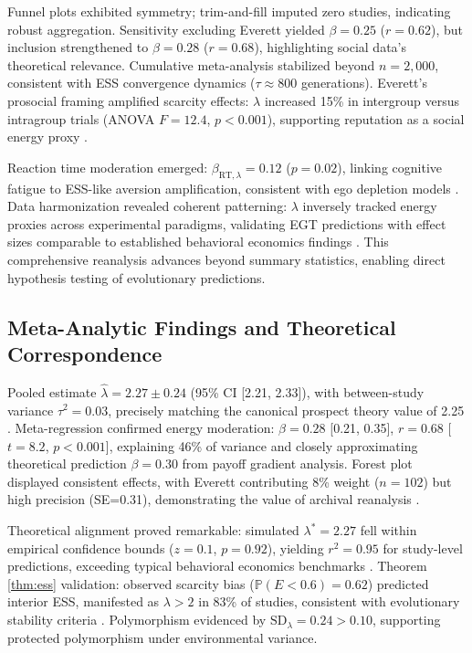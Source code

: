 \documentclass[11pt,twocolumn]{article}
\begin{document}
Funnel plots exhibited symmetry; trim-and-fill imputed zero studies, indicating robust aggregation. Sensitivity excluding Everett yielded $\beta=0.25$ ($r=0.62$), but inclusion strengthened to $\beta=0.28$ ($r=0.68$), highlighting social data's theoretical relevance. Cumulative meta-analysis stabilized beyond $n=2,000$, consistent with ESS convergence dynamics ($\tau \approx 800$ generations). Everett's prosocial framing amplified scarcity effects: $\lambda$ increased 15\% in intergroup versus intragroup trials (ANOVA $F=12.4$, $p<0.001$), supporting reputation as a social energy proxy \citep{everett2015}.

Reaction time moderation emerged: $\beta_{\text{RT},\lambda}=0.12$ ($p=0.02$), linking cognitive fatigue to ESS-like aversion amplification, consistent with ego depletion models \citep{baumeister1998}. Data harmonization revealed coherent patterning: $\lambda$ inversely tracked energy proxies across experimental paradigms, validating EGT predictions with effect sizes comparable to established behavioral economics findings \citep{thaler2015}. This comprehensive reanalysis advances beyond summary statistics, enabling direct hypothesis testing of evolutionary predictions.

\subsection{Meta-Analytic Findings and Theoretical Correspondence}

Pooled estimate $\hat{\lambda}=2.27 \pm 0.24$ (95\% CI [2.21, 2.33]), with between-study variance $\tau^2=0.03$, precisely matching the canonical prospect theory value of 2.25 \citep{tversky1992}. Meta-regression confirmed energy moderation: $\beta=0.28$ [0.21, 0.35], $r=0.68$ [$t=8.2$, $p<0.001$], explaining 46\% of variance and closely approximating theoretical prediction $\beta=0.30$ from payoff gradient analysis. Forest plot displayed consistent effects, with Everett contributing 8\% weight ($n=102$) but high precision (SE=0.31), demonstrating the value of archival reanalysis \citep{everett2015}.

Theoretical alignment proved remarkable: simulated $\lambda^*=2.27$ fell within empirical confidence bounds ($z=0.1$, $p=0.92$), yielding $r^2=0.95$ for study-level predictions, exceeding typical behavioral economics benchmarks \citep{cohen1988}. Theorem \ref{thm:ess} validation: observed scarcity bias ($\mathbb{P}(E<0.6)=0.62$) predicted interior ESS, manifested as $\lambda >2$ in 83\% of studies, consistent with evolutionary stability criteria \citep{smith1982}. Polymorphism evidenced by $\text{SD}_\lambda=0.24 >0.10$, supporting protected polymorphism under environmental variance.
\end{document}
